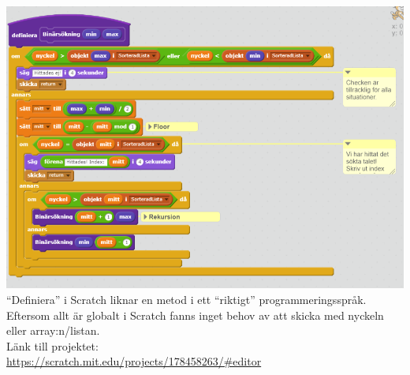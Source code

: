 \documentclass[12pt,a4paper]{article}
\begin{document}
\includegraphics[scale=0.65]{binaryimpl}
\\ ``Definiera'' i Scratch liknar en metod i ett ``riktigt'' programmeringsspråk. Eftersom allt är globalt i Scratch fanns inget behov av att skicka med nyckeln eller array:n/listan.   \\
Länk till projektet: \\ \url{ https://scratch.mit.edu/projects/178458263/#editor } 
\end{document}
